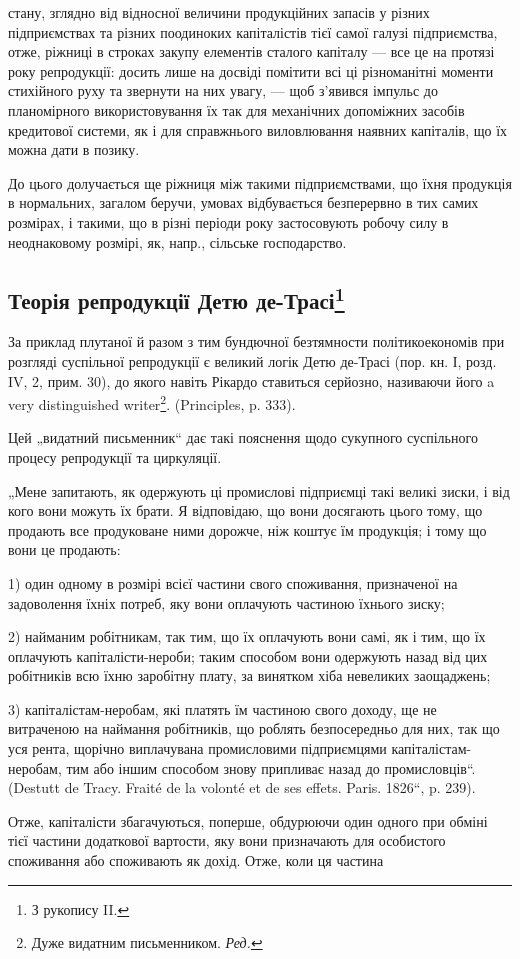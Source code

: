 \parcont{}  %
стану, зглядно від відносної величини продукційних запасів у різних
підприємствах та різних поодиноких капіталістів тієї самої галузі підприємства,
отже, ріжниці в строках закупу елементів сталого капіталу —
все це на протязі року репродукції: досить лише на досвіді помітити
всі ці різноманітні моменти стихійного руху та звернути на них увагу, —
щоб з’явився імпульс до планомірного використовування їх так для механічних
допоміжних засобів кредитової системи, як і для справжнього
виловлювання наявних капіталів, що їх можна дати в позику.

До цього долучається ще ріжниця між такими підприємствами, що
їхня продукція в нормальних, загалом беручи, умовах відбувається
безперервно в тих самих розмірах, і такими, що в різні періоди року
застосовують робочу силу в неоднаковому розмірі, як, напр., сільське
господарство.

\subsection{Теорія репродукції Детю де-Трасі\footnote{
З рукопису II.
}}

За приклад плутаної й разом з тим бундючної безтямности політикоекономів
при розгляді суспільної репродукції є великий логік Детю
де-Трасі (пор. кн. І, розд. IV, 2, прим. 30), до якого навіть Рікардо
ставиться серйозно, називаючи його a very distinguished writer\footnote*{
Дуже видатним письменником. \emph{Ред.}
}. (Principles,
p. 333).

Цей „видатний письменник“ дає такі пояснення щодо сукупного суспільного
процесу репродукції та циркуляції.

„Мене запитають, як одержують ці промислові підприємці такі великі
зиски, і від кого вони можуть їх брати. Я відповідаю, що вони досягають
цього тому, що продають все продуковане ними дорожче, ніж коштує
їм продукція; і тому що вони це продають:

1) один одному в розмірі всієї частини свого споживання, призначеної
на задоволення їхніх потреб, яку вони оплачують частиною їхнього
зиску;

2) найманим робітникам, так тим, що їх оплачують вони самі, як і тим, що їх
оплачують капіталісти-нероби; таким способом вони одержують назад від цих
робітників всю їхню заробітну плату, за винятком хіба невеликих заощаджень;

3) капіталістам-неробам, які платять їм частиною свого доходу, ще
не витраченою на наймання робітників, що роблять безпосередньо для
них, так що уся рента, щорічно виплачувана промисловими підприємцями
капіталістам-неробам, тим або іншим способом знову припливає
назад до промисловців“. (Destutt de Tracy. Fraité de la volonté et de ses
effets. Paris. 1826“, p. 239).

Отже, капіталісти збагачуються, поперше, обдурюючи один одного при
обміні тієї частини додаткової вартости, яку вони призначають для особистого
споживання або споживають як дохід. Отже, коли ця частина
\parbreak{}  %

